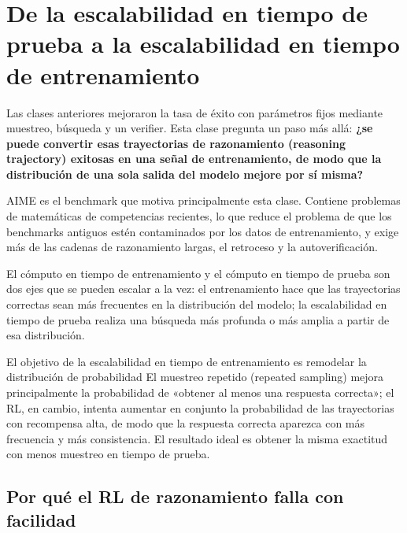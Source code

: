 \documentclass[a4paper]{article}
\begin{document}
\makelecturetitle

\section{De la escalabilidad en tiempo de prueba a la escalabilidad en tiempo de entrenamiento}

Las clases anteriores mejoraron la tasa de éxito con parámetros fijos mediante muestreo, búsqueda y un verifier. Esta clase pregunta un paso más allá: \textbf{¿se puede convertir esas trayectorias de razonamiento (reasoning trajectory) exitosas en una señal de entrenamiento, de modo que la distribución de una sola salida del modelo mejore por sí misma?}

AIME es el benchmark que motiva principalmente esta clase. Contiene problemas de matemáticas de competencias recientes, lo que reduce el problema de que los benchmarks antiguos estén contaminados por los datos de entrenamiento, y exige más de las cadenas de razonamiento largas, el retroceso y la autoverificación.


El cómputo en tiempo de entrenamiento y el cómputo en tiempo de prueba son dos ejes que se pueden escalar a la vez: el entrenamiento hace que las trayectorias correctas sean más frecuentes en la distribución del modelo; la escalabilidad en tiempo de prueba realiza una búsqueda más profunda o más amplia a partir de esa distribución.


\begin{importantbox}{El objetivo de la escalabilidad en tiempo de entrenamiento es remodelar la distribución de probabilidad}
El muestreo repetido (repeated sampling) mejora principalmente la probabilidad de «obtener al menos una respuesta correcta»; el RL, en cambio, intenta aumentar en conjunto la probabilidad de las trayectorias con recompensa alta, de modo que la respuesta correcta aparezca con más frecuencia y más consistencia. El resultado ideal es obtener la misma exactitud con menos muestreo en tiempo de prueba.
\end{importantbox}

\subsection{Por qué el RL de razonamiento falla con facilidad}
\end{document}
